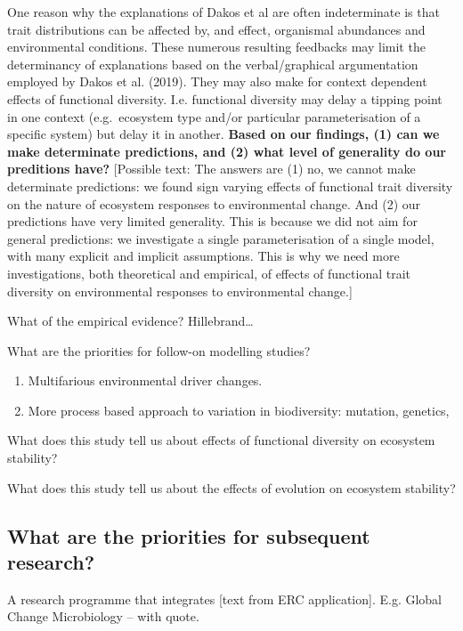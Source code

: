 \documentclass{article}
\begin{document}
One reason why the explanations of Dakos et al are often indeterminate
is that trait distributions can be affected by, and effect, organismal
abundances and environmental conditions. These numerous resulting
feedbacks may limit the determinancy of explanations based on the
verbal/graphical argumentation employed by Dakos et al. (2019). They may
also make for context dependent effects of functional diversity. I.e.
functional diversity may delay a tipping point in one context
(e.g.~ecosystem type and/or particular parameterisation of a specific
system) but delay it in another. \textbf{Based on our findings, (1) can
we make determinate predictions, and (2) what level of generality do our
preditions have?} {[}Possible text: The answers are (1) no, we cannot
make determinate predictions: we found sign varying effects of
functional trait diversity on the nature of ecosystem responses to
environmental change. And (2) our predictions have very limited
generality. This is because we did not aim for general predictions: we
investigate a single parameterisation of a single model, with many
explicit and implicit assumptions. This is why we need more
investigations, both theoretical and empirical, of effects of functional
trait diversity on environmental responses to environmental change.{]}

What of the empirical evidence? Hillebrand\ldots{}

What are the priorities for follow-on modelling studies?

\begin{enumerate}
\def\labelenumi{\arabic{enumi})}
\tightlist
\item
  Multifarious environmental driver changes.
\item
  More process based approach to variation in biodiversity: mutation,
  genetics,
\end{enumerate}

What does this study tell us about effects of functional diversity on
ecosystem stability?

What does this study tell us about the effects of evolution on ecosystem
stability?

\hypertarget{what-are-the-priorities-for-subsequent-research}{%
\subsection{What are the priorities for subsequent
research?}\label{what-are-the-priorities-for-subsequent-research}}

A research programme that integrates {[}text from ERC application{]}.
E.g. Global Change Microbiology -- with quote.
\end{document}
